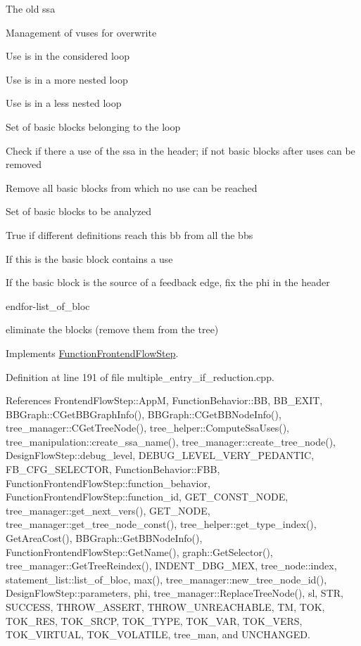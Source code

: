 The old ssa

Management of vuses for overwrite

Use is in the considered loop

Use is in a more nested loop

Use is in a less nested loop

Set of basic blocks belonging to the loop

Check if there a use of the ssa in the header; if not basic blocks after uses can be removed

Remove all basic blocks from which no use can be reached

Set of basic blocks to be analyzed

True if different definitions reach this bb from all the bbs

If this is the basic block contains a use

If the basic block is the source of a feedback edge, fix the phi in the header

endfor-\/list\+\_\+of\+\_\+bloc

eliminate the blocks (remove them from the tree) 

Implements \hyperlink{classFunctionFrontendFlowStep_a00612f7fb9eabbbc8ee7e39d34e5ac68}{Function\+Frontend\+Flow\+Step}.



Definition at line 191 of file multiple\+\_\+entry\+\_\+if\+\_\+reduction.\+cpp.



References Frontend\+Flow\+Step\+::\+AppM, Function\+Behavior\+::\+BB, B\+B\+\_\+\+E\+X\+IT, B\+B\+Graph\+::\+C\+Get\+B\+B\+Graph\+Info(), B\+B\+Graph\+::\+C\+Get\+B\+B\+Node\+Info(), tree\+\_\+manager\+::\+C\+Get\+Tree\+Node(), tree\+\_\+helper\+::\+Compute\+Ssa\+Uses(), tree\+\_\+manipulation\+::create\+\_\+ssa\+\_\+name(), tree\+\_\+manager\+::create\+\_\+tree\+\_\+node(), Design\+Flow\+Step\+::debug\+\_\+level, D\+E\+B\+U\+G\+\_\+\+L\+E\+V\+E\+L\+\_\+\+V\+E\+R\+Y\+\_\+\+P\+E\+D\+A\+N\+T\+IC, F\+B\+\_\+\+C\+F\+G\+\_\+\+S\+E\+L\+E\+C\+T\+OR, Function\+Behavior\+::\+F\+BB, Function\+Frontend\+Flow\+Step\+::function\+\_\+behavior, Function\+Frontend\+Flow\+Step\+::function\+\_\+id, G\+E\+T\+\_\+\+C\+O\+N\+S\+T\+\_\+\+N\+O\+DE, tree\+\_\+manager\+::get\+\_\+next\+\_\+vers(), G\+E\+T\+\_\+\+N\+O\+DE, tree\+\_\+manager\+::get\+\_\+tree\+\_\+node\+\_\+const(), tree\+\_\+helper\+::get\+\_\+type\+\_\+index(), Get\+Area\+Cost(), B\+B\+Graph\+::\+Get\+B\+B\+Node\+Info(), Function\+Frontend\+Flow\+Step\+::\+Get\+Name(), graph\+::\+Get\+Selector(), tree\+\_\+manager\+::\+Get\+Tree\+Reindex(), I\+N\+D\+E\+N\+T\+\_\+\+D\+B\+G\+\_\+\+M\+EX, tree\+\_\+node\+::index, statement\+\_\+list\+::list\+\_\+of\+\_\+bloc, max(), tree\+\_\+manager\+::new\+\_\+tree\+\_\+node\+\_\+id(), Design\+Flow\+Step\+::parameters, phi, tree\+\_\+manager\+::\+Replace\+Tree\+Node(), sl, S\+TR, S\+U\+C\+C\+E\+SS, T\+H\+R\+O\+W\+\_\+\+A\+S\+S\+E\+RT, T\+H\+R\+O\+W\+\_\+\+U\+N\+R\+E\+A\+C\+H\+A\+B\+LE, TM, T\+OK, T\+O\+K\+\_\+\+R\+ES, T\+O\+K\+\_\+\+S\+R\+CP, T\+O\+K\+\_\+\+T\+Y\+PE, T\+O\+K\+\_\+\+V\+AR, T\+O\+K\+\_\+\+V\+E\+RS, T\+O\+K\+\_\+\+V\+I\+R\+T\+U\+AL, T\+O\+K\+\_\+\+V\+O\+L\+A\+T\+I\+LE, tree\+\_\+man, and U\+N\+C\+H\+A\+N\+G\+ED.


